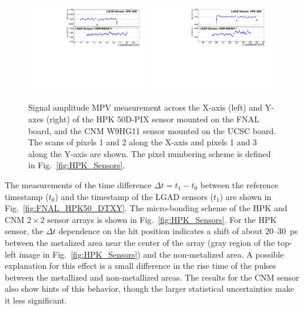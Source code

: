 \documentclass[preprint,1p]{elsarticle}
\begin{document}
\begin{figure}[htbp] 
\centering
\includegraphics[width=0.49\textwidth]{figs/HPK50DVsCNM_MPV_vs_X.pdf} 
\includegraphics[width=0.49\textwidth]{figs/HPK50DVsCNM_MPV_vs_Y.pdf} 
\caption{Signal amplitude MPV measurement across the X-axis (left) and Y-axes (right) of 
the HPK 50D-PIX sensor mounted on the FNAL board, and the CNM W9HG11 sensor mounted on 
the UCSC board. The scans of pixels 1 and 2 along the X-axis and pixels 1 and 3 
along the Y-axis are shown. The pixel numbering scheme is defined in Fig.~\ref{fig:HPK_Sensors}.} 
\label{fig:FNAL_HPK50_MPVXY} 
\end{figure} 


The measurements of the time difference $\Delta t = t_{1}-t_{0}$ between the
reference timestamp ($t_0$) and the timestamp of the LGAD sensors ($t_1$) are
shown in Fig.~\ref{fig:FNAL_HPK50_DTXY}. The micro-bonding scheme of the HPK and CNM 
$2\times 2$ sensor arrays is shown in Fig.~\ref{fig:HPK_Sensors}. For the HPK sensor,
the $\Delta t$ dependence on the hit position indicates a shift of 
about $20$--$30$~ps between the metalized area near the center of the array
(gray region of the top-left image in Fig.~\ref{fig:HPK_Sensors}) and the non-metalized area.
A possible explanation for this effect is a small difference in
the rise time of the pulses between the metallized and non-metallized areas. 
The results for the CNM sensor also show hints of this behavior, though the
larger statistical uncertainties make it less significant.
\end{document}
